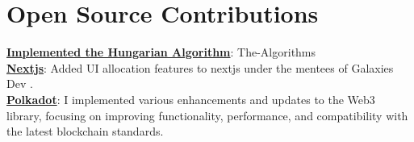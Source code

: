\documentclass[a4paper,11pt]{article}
\makeatletter
\newcommand{\resumeItem}[1]{
  \item\small{
    {#1 \vspace{-2pt}}
  }
}
\newcommand{\resumeProjectHeading}[2]{
    \item
    \begin{tabular*}{1.001\textwidth}{l@{\extracolsep{\fill}}r}
      \small#1 & \textbf{\small #2}\\
    \end{tabular*}\vspace{-7pt}
}
\newcommand{\resumeSubHeadingListStart}{\begin{itemize}[leftmargin=0.0in, label={}]}
\newcommand{\resumeSubHeadingListEnd}{\end{itemize}}
\newcommand{\resumeItemListStart}{\begin{itemize}}
\newcommand{\resumeItemListEnd}{\end{itemize}\vspace{-5pt}}
\makeatother
\begin{document}

%
\section{Open Source Contributions}
 \begin{itemize}[leftmargin=0.15in, label={}]
    \small{\item{
     \textbf{\href{https://github.com/TheAlgorithms/Python}{Implemented the Hungarian Algorithm}}{: The-Algorithms} \\
     \textbf{\href{https://github.com/Galaxies-dev}{Nextjs}}{: Added UI allocation features to nextjs under the mentees of Galaxies Dev .} \\
     \textbf{\href{https://github.com/Jhwach/polkadot-wiki}{Polkadot}}{: I implemented various enhancements and updates to the Web3 library, focusing on improving functionality, performance, and compatibility with the latest blockchain standards.} \\
    }}
 \end{itemize}
 \vspace{-16pt}
\end{document}
